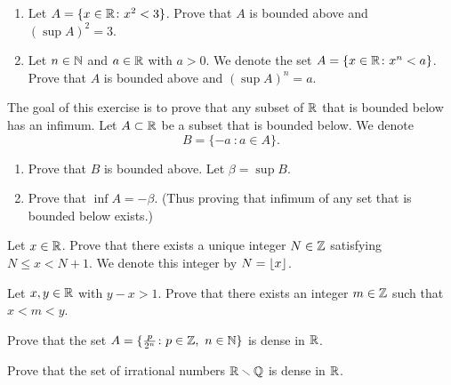\documentclass[10pt, a4paper]{article}
\begin{document}
\begin{exercise}
  \text{}
  \begin{enumerate}
  \item
    Let \(A = \{x\in\mathbb{R} \colon x^2 < 3\}\). Prove that \(A\) is bounded above and
    \((\sup A)^2 = 3\).
  \item 
    Let \(n\in\mathbb{N}\) and \(a\in\mathbb{R}\) with \(a > 0\).
    We denote the set  \(A = \{x\in\mathbb{R} \colon x^n < a\}\).
    Prove that \(A\) is bounded above and \((\sup A)^n = a\).
  \end{enumerate}
\end{exercise}

\begin{exercise}[Infimum]
  The goal of this exercise is to prove that any subset of
  \(\mathbb{R}\) that is bounded below has an infimum.
  Let \(A\subset\mathbb{R}\) be a subset that is bounded below.
  We denote
  \[B = \{-a~ \colon a\in A\}.\]
  \begin{enumerate}
  \item Prove that \(B\) is bounded above. Let \(\beta = \sup B\).
  \item Prove that \(\inf A = -\beta\). (Thus proving that infimum
    of any set that is bounded below exists.)
  \end{enumerate}
\end{exercise}

\begin{exercise}
  Let \(x\in\mathbb{R}\). Prove that there exists a unique integer \(N\in\mathbb{Z}\)
  satisfying \(N\leq x < N+1\). We denote this integer by \(N=\lfloor x\rfloor\).
\end{exercise}

\begin{exercise}
  Let \(x,y\in\mathbb{R}\) with \(y-x>1\). Prove that there exists an integer
  \(m\in\mathbb{Z}\) such that \(x<m<y\).
\end{exercise}

\begin{exercise}
  Prove that the set \(A = \{\frac{p}{2^n}\colon p\in\mathbb{Z},~n\in\mathbb{N}\}\)
  is dense in \(\mathbb{R}\).
\end{exercise}

\begin{exercise}
  Prove that the set of irrational numbers \(\mathbb{R}\smallsetminus\mathbb{Q}\)
  is dense in \(\mathbb{R}\).
\end{exercise}


\end{document}
